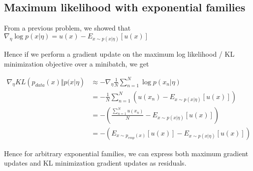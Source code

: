 \documentclass[a4paper]{article}
\begin{document}
\subsection{Maximum likelihood with exponential families}

From a previous problem, we showed that $\nabla_\eta \log p(x \vert \eta) = u(x) - E_{ x \sim p( x \vert \eta) } \left[ u(x) \right]$

Hence if we perform a gradient update on the maximum log likelihood / KL minimization objective over a minibatch, we get

\begin{equation}
  \begin{split}
    \nabla_\eta KL\left( p_{data}(x) \Vert p( x \vert \eta \right) &\approx - \nabla_\eta \frac{1}{N} \sum_{n=1}^N \log p(x_n \vert \eta) \\
    &= - \frac{1}{N} \sum_{n=1}^N \left( u(x_n) - E_{ x \sim p(x \vert \eta)} \left[ u(x) \right] \right) \\
    &= - \left( \frac{\sum_{n=1}^N u(x_n)}{N} - E_{ x \sim p(x \vert \eta)} \left[ u(x) \right] \right) \\
    &= - \left( E_{ x \sim p_{emp}(x)} \left[ u(x) \right] - E_{ x \sim p( x \vert \eta)} \left[ u(x) \right] \right)
  \end{split}
  \label{}
\end{equation}

Hence for arbitrary exponential families, we can express both maximum gradient updates and KL minimization gradient updates as residuals.
\end{document}
